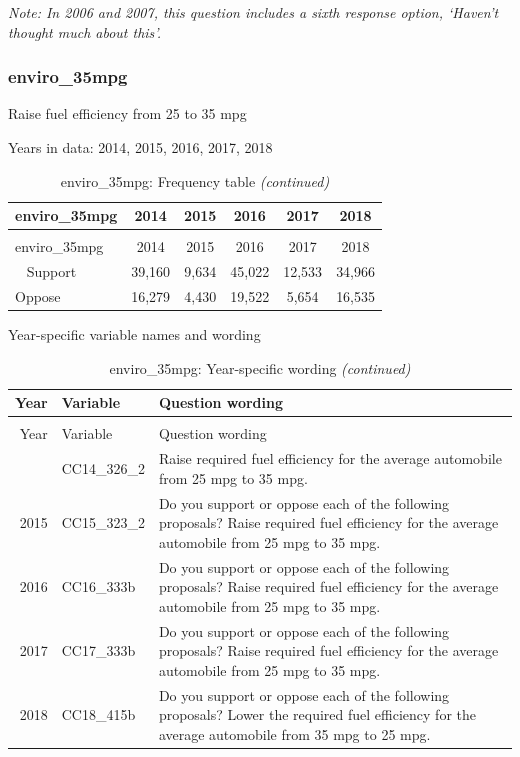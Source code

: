 \documentclass[12pt]{article}
\begin{document}
\emph{Note: In 2006 and 2007, this question includes a sixth response
option, `Haven't thought much about this'.}

\subsubsection{enviro\_35mpg}\label{enviro_35mpg}

Raise fuel efficiency from 25 to 35 mpg

Years in data: 2014, 2015, 2016, 2017, 2018

\begin{longtable}[t]{lccccc}
\caption{\label{tab:unnamed-chunk-4}enviro\_35mpg: Frequency table}\\
\toprule
enviro\_35mpg & 2014 & 2015 & 2016 & 2017 & 2018\\
\midrule
\endfirsthead
\caption[]{enviro\_35mpg: Frequency table \textit{(continued)}}\\
\toprule
enviro\_35mpg & 2014 & 2015 & 2016 & 2017 & 2018\\
\midrule
\endhead
\
\endfoot
\bottomrule
\endlastfoot
Support & 39,160 & 9,634 & 45,022 & 12,533 & 34,966\\
Oppose & 16,279 & 4,430 & 19,522 & 5,654 & 16,535\\*
\end{longtable}

Year-specific variable names and wording

\begin{longtable}[t]{rl>{\raggedright\arraybackslash}p{10cm}}
\caption{\label{tab:unnamed-chunk-4}enviro\_35mpg: Year-specific wording}\\
\toprule
Year & Variable & Question wording\\
\midrule
\endfirsthead
\caption[]{enviro\_35mpg: Year-specific wording \textit{(continued)}}\\
\toprule
Year & Variable & Question wording\\
\midrule
\endhead
\
\endfoot
\bottomrule
\endlastfoot
2014 & CC14\_326\_2 & Raise required fuel efficiency for the average automobile from 25 mpg to 35 mpg.\\
2015 & CC15\_323\_2 & Do you support or oppose each of the following proposals? Raise required fuel efficiency for the average automobile from 25 mpg to 35 mpg.\\
2016 & CC16\_333b & Do you support or oppose each of the following proposals? Raise required fuel efficiency for the average automobile from 25 mpg to 35 mpg.\\
2017 & CC17\_333b & Do you support or oppose each of the following proposals? Raise required fuel efficiency for the average automobile from 25 mpg to 35 mpg.\\
2018 & CC18\_415b & Do you support or oppose each of the following proposals? Lower the required fuel efficiency for the average automobile from 35 mpg to 25 mpg.\\*
\end{longtable}
\end{document}
